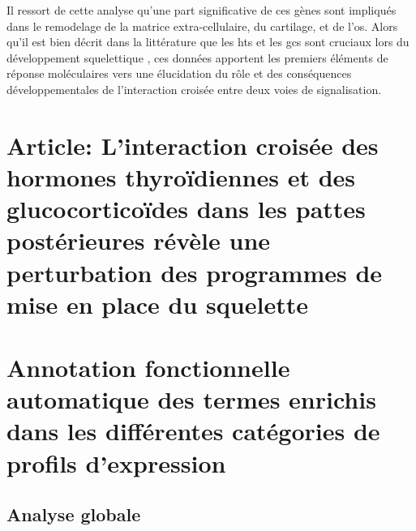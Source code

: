 \documentclass[../main.tex]{subfiles}
\begin{document}
Il ressort de cette analyse qu'une part significative de ces gènes sont impliqués dans le remodelage de la matrice extra-cellulaire, du cartilage, et de l'os.
Alors qu'il est bien décrit dans la littérature que les \glspl{ht} et les \glspl{gc} sont cruciaux lors du développement squelettique \citep{Robson2002,Wojcicka2013a}, ces données apportent les premiers éléments de réponse moléculaires vers une élucidation du rôle et des conséquences développementales de l'interaction croisée entre deux voies de signalisation.




\section{Article: L'interaction croisée des hormones thyroïdiennes et des glucocorticoïdes dans les pattes postérieures révèle une perturbation des programmes de mise en place du squelette}\label{sec:grimaldi2014}

%
%
%
%
%




\section{Annotation fonctionnelle automatique des termes enrichis dans les différentes catégories de profils d'expression}\label{sec:hlc-preanalysis}


\subsection{Analyse globale}
\end{document}
